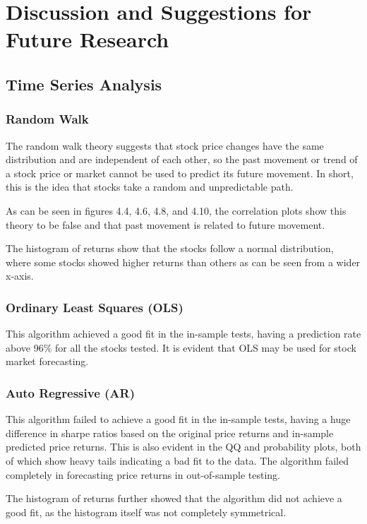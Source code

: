 \chapter{Discussion and Suggestions for Future Research}

\section{Time Series Analysis}

\subsection{Random Walk}
The random walk theory suggests that stock price changes have the same distribution and are independent of each other, so the past movement or trend of a stock price or market cannot be used to predict its future movement. In short, this is the idea that stocks take a random and unpredictable path.

As can be seen in figures 4.4, 4.6, 4.8, and 4.10, the correlation plots show this theory to be false and that past movement is related to future movement.

The histogram of returns show that the stocks follow a normal distribution, where some stocks showed higher returns than others as can be seen from a wider x-axis.

\subsection{Ordinary Least Squares (OLS)}
This algorithm achieved a good fit in the in-sample tests, having a prediction rate above 96\% for all the stocks tested. It is evident that OLS may be used for stock market forecasting.

\subsection{Auto Regressive (AR)}
This algorithm failed to achieve a good fit in the in-sample tests, having a huge difference in sharpe ratios based on the original price returns and in-sample predicted price returns. This is also evident in the QQ and probability plots, both of which show heavy tails indicating a bad fit to the data. The algorithm failed completely in forecasting price returns in out-of-sample testing. 

The histogram of returns further showed that the algorithm did not achieve a good fit, as the histogram itself was not completely symmetrical.

